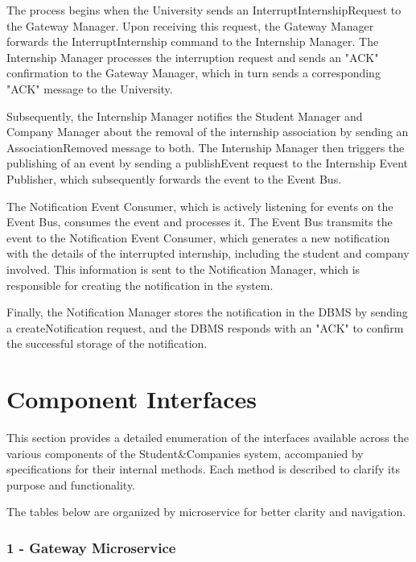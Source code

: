 
The process begins when the University sends an InterruptInternshipRequest to the Gateway Manager. Upon receiving this request, the Gateway Manager forwards the InterruptInternship command to the Internship Manager. The Internship Manager processes the interruption request and sends an "ACK" confirmation to the Gateway Manager, which in turn sends a corresponding "ACK" message to the University.

Subsequently, the Internship Manager notifies the Student Manager and Company Manager about the removal of the internship association by sending an AssociationRemoved message to both. The Internship Manager then triggers the publishing of an event by sending a publishEvent request to the Internship Event Publisher, which subsequently forwards the event to the Event Bus.

The Notification Event Consumer, which is actively listening for events on the Event Bus, consumes the event and processes it. The Event Bus transmits the event to the Notification Event Consumer, which generates a new notification with the details of the interrupted internship, including the student and company involved. This information is sent to the Notification Manager, which is responsible for creating the notification in the system.

Finally, the Notification Manager stores the notification in the DBMS by sending a createNotification request, and the DBMS responds with an "ACK" to confirm the successful storage of the notification.

\section{Component Interfaces}

This section provides a detailed enumeration of the interfaces available across the various components of the Student\&Companies system, accompanied by specifications for their internal methods. Each method is described to clarify its purpose and functionality. 

The tables below are organized by microservice for better clarity and navigation.

\subsubsection{1 - Gateway Microservice}

